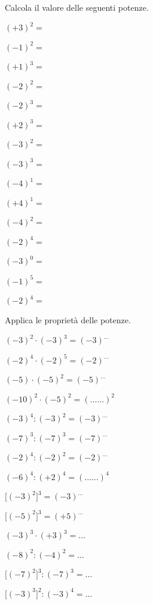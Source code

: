 \begin{esercizio}
\label{ese:2.22}
Calcola il valore delle seguenti potenze.
\begin{multicols}{3}
 \begin{enumeratea}
 \item \((+3)^2 =\)
 \item \((-1)^2 =\)
 \item \((+1)^3 =\)
 \item \((-2)^2 =\)
 \item \((-2)^3 =\)
 \item \((+2)^3 =\)
 \item \((-3)^2 =\)
 \item \((-3)^3 =\)
 \item \((-4)^1 =\)
 \item \((+4)^1 =\)
 \item \((-4)^2 =\)
 \item \((-2)^4 =\)
 \item \((-3)^0 =\)
 \item \((-1)^5 =\)
 \item \((-2)^4 =\)
 \end{enumeratea}
 \end{multicols}
\end{esercizio}

\begin{esercizio}
\label{ese:2.23}
 Applica le proprietà delle potenze.
\begin{multicols}{2}
 \begin{enumeratea}
 \item \((-3)^2\cdot(-3)^3 = (-3)^{\ldots}\)
 \item \((-2)^4\cdot(-2)^5 = (-2)^{\ldots}\)
 \item \((-5)\cdot(-5)^2 = (-5)^{\ldots}\)
 \item \((-10)^2\cdot(-5)^2 = (\ldots \ldots)^2\)
 \item \((-3)^4:(-3)^2 = (-3)^{\ldots}\)
 \item \((-7)^3:(-7)^3=(-7)^{\ldots}\)
 \item \((-2)^4:(-2)^2=(-2)^{\ldots}\)
 \item \((-6)^4:(+2)^4=(\ldots \ldots)^4\)
 \item \(\big[(-3)^2\big]^3 = (-3)^{\ldots}\)
 \item \(\big[(-5)^2\big]^3=(+5)^{\ldots}\)
 \item \((-3)^3\cdot(+3)^3 = \ldots\)
 \item \((-8)^2:(-4)^2= \ldots\)
 \item \(\big[(-7)^2\big]^3: (-7)^3 =\ldots\)
 \item \(\big[(-3)^3\big]^2: (-3)^4=\ldots\)
 \end{enumeratea}
 \end{multicols}
\end{esercizio}



